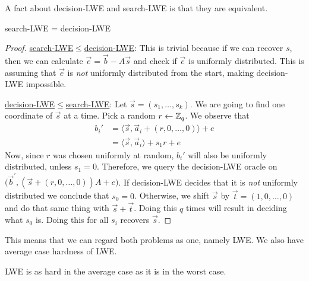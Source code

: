     A fact about decision-LWE and search-LWE is that they are equivalent. 
    \begin{proposition}
    search-LWE = decision-LWE
    \end{proposition}
    \begin{proof}
        \underline{search-LWE\(\leq\)decision-LWE}: This is trivial because if we can recover \(s\), then we can calculate \(\vec{e} = \vec{b} - A\vec{s}\) and check if \(\vec{e}\) is uniformly distributed. This is assuming that \(\vec{e}\) is \emph{not} uniformly distributed from the start, making decision-LWE impossible.\par
        \noindent\underline{decision-LWE\(\leq\)search-LWE}: Let \(\vec{s} = (s_1,\dots ,s_{k})\). We are going to find one coordinate of \(\vec{s}\) at a time. Pick a random \(r\leftarrow\mathbb{Z}_q\). We observe that 
        \[
            \begin{split}
                b_i' & =  \langle \vec{s}, \vec{a}_i  + (r, 0,\dots , 0)\rangle + e \\
                & = \langle \vec{s}, \vec{a}_i\rangle + s_1r + e
            \end{split}
        \]
        Now, since \(r\) was chosen uniformly at random, \(b_i'\) will also be uniformly distributed, unless \(s_1 = 0\). Therefore, we query the decision-LWE oracle on \(\big(\vec{b}^{'}, (\vec{s} + (r,0,\dots ,0))A + e\big)\). If decision-LWE decides that it is \emph{not} uniformly distributed we conclude that \(s_0 = 0\). Otherwise, we shift  \(\vec{s}\) by \(\vec{t} = (1,0, \dots, 0)\) and do that same thing with \(\vec{s} + \vec{t}\). Doing this \(q\) times will result in deciding what \(s_0\) is. Doing this for all \(s_i\) recovers \(\vec{s}\).
    \end{proof}
    This means that we can regard both problems as one, namely LWE. We also have average case hardness of LWE.
    \begin{proposition}
        LWE is as hard in the average case as it is in the worst case.
    \end{proposition}
